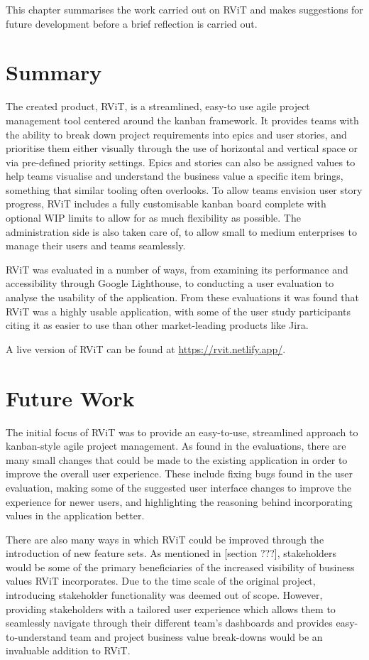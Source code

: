 \documentclass[l4proj.tex]{subfiles}
\begin{document}
  

This chapter summarises the work carried out on RViT and makes suggestions for future development before a brief reflection is carried out. 

\section{Summary}
The created product, RViT, is a streamlined, easy-to use agile project management tool centered around the kanban framework. It provides teams with the ability to break down project requirements into epics and user stories, and prioritise them either visually through the use of horizontal and vertical space or via pre-defined priority settings. Epics and stories can also be assigned values to help teams visualise and understand the business value a specific item brings, something that similar tooling often overlooks. To allow teams envision user story progress, RViT includes a fully customisable kanban board complete with optional WIP limits to allow for as much flexibility as possible. The administration side is also taken care of, to allow small to medium enterprises to manage their users and teams seamlessly.

RViT was evaluated in a number of ways, from examining its performance and accessibility through Google Lighthouse, to conducting a user evaluation to analyse the usability of the application. From these evaluations it was found that RViT was a highly usable application, with some of the user study participants citing it as easier to use than other market-leading products like Jira. 

A live version of RViT can be found at \url{https://rvit.netlify.app/}.

\section{Future Work}
The initial focus of RViT was to provide an easy-to-use, streamlined approach to kanban-style agile project management. As found in the evaluations, there are many small changes that could be made to the existing application in order to improve the overall user experience. These include fixing bugs found in the user evaluation, making some of the suggested user interface changes to improve the experience for newer users, and highlighting the reasoning behind incorporating values in the application better. 

There are also many ways in which RViT could be improved through the introduction of new feature sets. As mentioned in [section ???], stakeholders would be some of the primary beneficiaries of the increased visibility of business values RViT incorporates. Due to the time scale of the original project, introducing stakeholder functionality was deemed out of scope. However, providing stakeholders with a tailored user experience which allows them to seamlessly navigate through their different team's dashboards and provides easy-to-understand team and project business value break-downs would be an invaluable addition to RViT.
\end{document}
